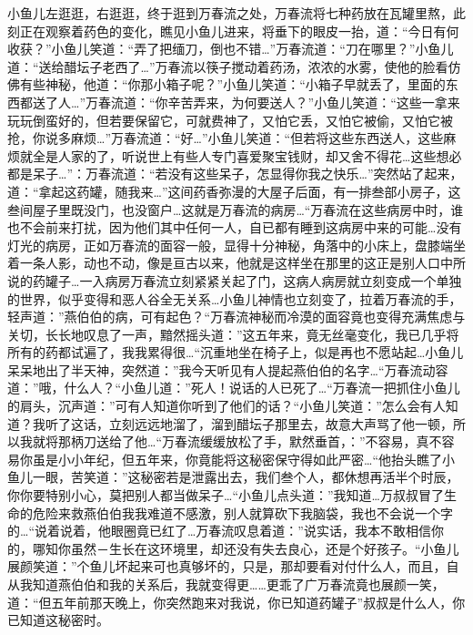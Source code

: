 \documentclass[12pt,oneside]{book}
\begin{document}
小鱼儿左逛逛，右逛逛，终于逛到万春流之处，万春流将七种药放在瓦罐里熬，此刻正在观察着药色的变化，瞧见小鱼儿进来，将垂下的眼皮一抬，道：``今日有何收获？''小鱼儿笑道：``弄了把缅刀，倒也不错\ldots{}''万春流道：``刀在哪里？''小鱼儿道：``送给醋坛子老西了\ldots{}''万春流以筷子搅动着药汤，浓浓的水雾，使他的脸看仿佛有些神秘，他道：``你那小箱子呢？''小鱼儿笑道：``小箱子早就丢了，里面的东西都送了人\ldots{}''万春流道：``你辛苦弄来，为何要送人？''小鱼儿笑道：``这些一拿来玩玩倒蛮好的，但若要保留它，可就费神了，又怕它丢，又怕它被偷，又怕它被抢，你说多麻烦\ldots{}''万春流道：``好\ldots{}''小鱼儿笑道：``但若将这些东西送人，这些麻烦就全是人家的了，听说世上有些人专门喜爱聚宝钱财，却又舍不得花\ldots 这些想必都是呆子\ldots{}''：万春流道：``若没有这些呆子，怎显得你我之快乐\ldots{}''突然站了起来，道：``拿起这药罐，随我来\ldots{}''这间药香弥漫的大屋子后面，有一排叁部小房子，这叁间屋子里既没门，也没窗户\ldots 这就是万春流的病房\ldots{}``万春流在这些病房中时，谁也不会前来打扰，因为他们其中任何一人，自已都有睡到这病房中来的可能\ldots 没有灯光的病房，正如万春流的面容一般，显得十分神秘，角落中的小床上，盘膝端坐着一条人影，动也不动，像是亘古以来，他就是这样坐在那里的这正是别人口中所说的药罐子\ldots 一入病房万春流立刻紧紧关起了门，这病人病房就立刻变成一个单独的世界，似乎变得和恶人谷全无关系\ldots 小鱼儿神情也立刻变了，拉着万春流的手，轻声道：''燕伯伯的病，可有起色？``万春流神秘而冷漠的面容竟也变得充满焦虑与关切，长长地叹息了一声，黯然摇头道：''这五年来，竟无丝毫变化，我已几乎将所有的药都试遍了，我我累得很\ldots{}``沉重地坐在椅子上，似是再也不愿站起\ldots 小鱼儿呆呆地出了半天神，突然道：''我今天听见有人提起燕伯伯的名字\ldots{}``万春流动容道：''哦，什么人？``小鱼儿道：''死人！说话的人已死了\ldots{}``万春流一把抓住小鱼儿的肩头，沉声道：''可有人知道你听到了他们的话？``小鱼儿笑道：''怎么会有人知道？我听了这话，立刻远远地溜了，溜到醋坛子那里去，故意大声骂了他一顿，所以我就将那柄刀送给了他\ldots{}``万春流缓缓放松了手，默然垂首，：''不容易，真不容易你虽是小小年纪，但五年来，你竟能将这秘密保守得如此严密\ldots{}``他抬头瞧了小鱼儿一眼，苦笑道：''这秘密若是泄露出去，我们叁个人，都休想再活半个时辰，你你要特别小心，莫把别人都当做呆子\ldots{}``小鱼儿点头道：''我知道\ldots 万叔叔冒了生命的危险来救燕伯伯我我难道不感激，别人就算砍下我脑袋，我也不会说一个字的\ldots{}``说着说着，他眼圈竟已红了\ldots 万春流叹息着道：''说实话，我本不敢相信你的，哪知你虽然－生长在这环境里，却还没有失去良心，还是个好孩子。``小鱼儿展颜笑道：''个鱼儿坏起来可也真够坏的，只是，那却要看对付什么人，而且，自从我知道燕伯伯和我的关系后，我就变得更\ldots\ldots 更乖了广万春流竟也展颜一笑，道：``但五年前那天晚上，你突然跑来对我说，你已知道药罐子''叔叔是什么人，你已知道这秘密时。
\end{document}
